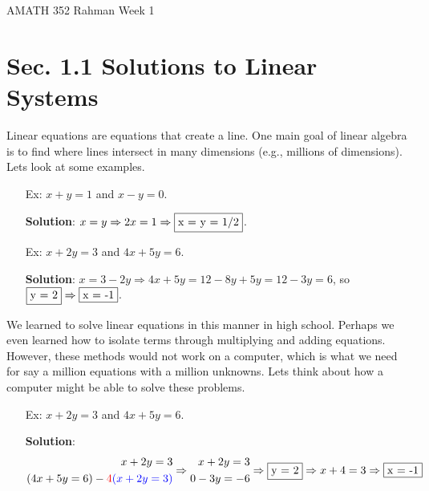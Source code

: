 \documentclass[reqno]{amsart}
\theoremstyle{definition}
\begin{document}
\begin{flushleft}
{\sc \Large AMATH 352 Rahman} \hfill Week 1
\bigskip
\end{flushleft}

\newcommand{\R}{\mathbb{R}}
\newcommand{\N}{\mathbb{N}}
\newcommand{\Z}{\mathbb{Z}}
\newcommand{\Q}{\mathbb{Q}}
\renewcommand{\CancelColor}{\color{red}}
\newcommand{\?}{\stackrel{?}{=}}
\renewcommand{\varphi}{\phi}
\newcommand{\card}{\text{Card}}



\section*{Sec. 1.1 Solutions to Linear Systems}

Linear equations are equations that create a line.  One main goal of linear algebra is to find where
lines intersect in many dimensions (e.g., millions of dimensions).  Lets look at some examples.

\begin{itemize}

\item[Ex:  ]  $x + y = 1$ and $x - y = 0$.

 \textbf{Solution}: $x = y \Rightarrow 2x = 1 \Rightarrow \fbox{x = y = 1/2}$.

\item[Ex:  ]  $x + 2y = 3$ and $4x + 5y = 6$. 

\textbf{Solution}: $x = 3 - 2y \Rightarrow 4x + 5y = 12 - 8y + 5y = 12 - 3y = 6$,
so $\fbox{y = 2} \Rightarrow \fbox{x = -1}$.

\end{itemize}

We learned to solve linear equations in this manner in high school.  Perhaps we even learned how to
isolate terms through multiplying and adding equations.  However, these methods would not work on
a computer, which is what we need for say a million equations with a million unknowns.  Lets think about
how a computer might be able to solve these problems.

\begin{itemize}

\item[Ex:  ]  $x + 2y = 3$ and $4x + 5y = 6$. 

\textbf{Solution}:
\begin{equation*}
\begin{split}
x + 2y = 3\\
(4x + 5y = 6) - {\color{red}4}{\color{blue}(x + 2y = 3)}
\end{split} \Rightarrow 
\begin{split}
x + 2y = 3\\
0 - 3y = -6
\end{split} \Rightarrow
\fbox{y = 2} \Rightarrow x+4 = 3 \Rightarrow \fbox{x = -1}
\end{equation*}

\end{itemize}
\end{document}
